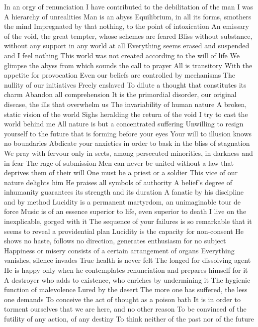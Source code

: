 \documentclass{article}
\begin{document}
In an orgy of renunciation
I have contributed to the debilitation of the man I was
A hierarchy of unrealities
Man is an abyss
Equilibrium, in all its forms, smothers the mind
Impregnated by that nothing, to the point of intoxication
An emissary of the void, the great tempter, whose schemes are feared
Bliss without substance, without any support in any world at all
Everything seems erased and suspended and I feel nothing
This world was not created according to the will of life
We glimpse the abyss from which sounds the call to prayer
All is transitory
With the appetite for provocation
Even our beliefs are controlled by mechanisms
The nullity of our initiatives
Freely enslaved
To dilute a thought that constitutes its charm
Abandon all comprehension
It is the primordial disorder, our original disease, the ills that overwhelm us
The invariability of human nature
A broken, static vision of the world
Sighs heralding the return of the void
I try to cast the world behind me
All nature is but a concentrated suffering
Unwilling to resign yourself to the future that is forming before your eyes
Your will to illusion knows no boundaries
Abdicate your anxieties in order to bask in the bliss of stagnation
We pray with fervour only in sects, among persecuted minorities, in darkness and in fear
The rage of submission
Men can never be united without a law that deprives them of their will
One must be a priest or a soldier
This vice of our nature delights him
He praises all symbols of authority
A belief's degree of inhumanity guarantees its strength and its duration
A fanatic by his discipline and by method
Lucidity is a permanent martyrdom, an unimaginable tour de force
Music is of an essence superior to life, even superior to death
I live on the inexplicable, gorged with it
The sequence of your failures is so remarkable that it seems to reveal a providential plan
Lucidity is the capacity for non-consent
He shows no haste, follows no direction, generates enthusiasm for no subject
Happiness or misery consists of a certain arrangement of organs
Everything vanishes, silence invades
True health is never felt
The longed for dissolving agent
He is happy only when he contemplates renunciation and prepares himself for it
A destroyer who adds to existence, who enriches by undermining it
The hygienic function of malevolence
Lured by the desert
The more one has suffered, the less one demands
To conceive the act of thought as a poison bath
It is in order to torment ourselves that we are here, and no other reason
To be convinced of the futility of any action, of any destiny
To think neither of the past nor of the future
\end{document}
